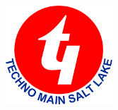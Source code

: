 \begin{titlepage}
\begin{center}
        \begin{figure}[!h]
            \centering
            \includegraphics[width=40mm]{./Images/tmsl.png}
        \end{figure}
        
        
        
        
        \begin{adjustwidth}{-1.5cm}{-1.5cm}
        
            \noindent
            \\
            \noindent
        \end{adjustwidth}

        
   

    
    \end{center}
\end{titlepage}
    